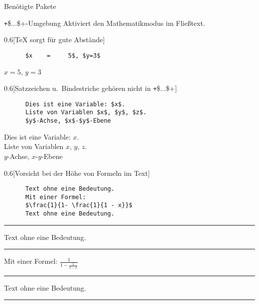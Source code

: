 \begin{frame}[fragile,t]{
  Benötigte Pakete
  \hfill
}

  \vspace{5pt}
\end{frame}

\begin{frame}[fragile]{\texttt+\$...\$+-Umgebung}
  Aktiviert den Mathematikmodus im Fließtext.

  \begin{CodeExample}{0.6}[\TeX{} sorgt für gute Abstände]
    \begin{verbatim}
      $x    =     5$, $y=3$
    \end{verbatim}
  \CodeResult
    \strut
    $x    =     5$, $y=3$
  \end{CodeExample}

  \begin{CodeExample}{0.6}[Satzzeichen u.\ Bindestriche gehören nicht in \texttt+\$...\$+]
    \begin{verbatim}
      Dies ist eine Variable: $x$.
      Liste von Variablen $x$, $y$, $z$.
      $y$-Achse, $x$-$y$-Ebene
    \end{verbatim}
  \CodeResult
    \strut
    Dies ist eine Variable: $x$. \\
    Liste von Variablen $x$, $y$, $z$. \\
    $y$-Achse, $x$-$y$-Ebene
  \end{CodeExample}
  \begin{CodeExample}{0.6}[Vorsicht bei der Höhe von Formeln im Text]
    \begin{verbatim}
      Text ohne eine Bedeutung.
      Mit einer Formel:
      $\frac{1}{1- \frac{1}{1 - x}}$
      Text ohne eine Bedeutung.
    \end{verbatim}
  \CodeResult
    \hrule
    Text ohne eine Bedeutung.
    \hrule
    Mit einer Formel: $\frac{1}{1- \frac{1}{1 - x}}$
    \hrule
    Text ohne eine Bedeutung.
    \hrule
  \end{CodeExample}
\end{frame}

